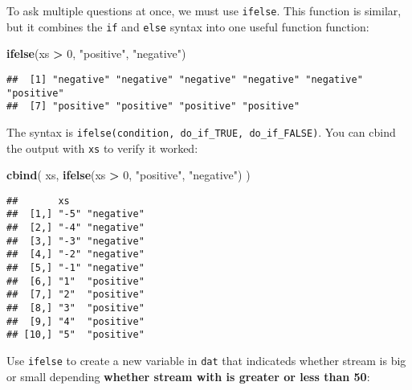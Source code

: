 \documentclass[]{book}
\newenvironment{Shaded}{\begin{snugshade}}{\end{snugshade}}
\newcommand{\KeywordTok}[1]{\textcolor[rgb]{0.13,0.29,0.53}{\textbf{#1}}}
\newcommand{\DecValTok}[1]{\textcolor[rgb]{0.00,0.00,0.81}{#1}}
\newcommand{\StringTok}[1]{\textcolor[rgb]{0.31,0.60,0.02}{#1}}
\newcommand{\OperatorTok}[1]{\textcolor[rgb]{0.81,0.36,0.00}{\textbf{#1}}}
\newcommand{\NormalTok}[1]{#1}
\theoremstyle{definition}
\theoremstyle{definition}
\theoremstyle{definition}
\theoremstyle{remark}
\begin{document}
To ask multiple questions at once, we must use \texttt{ifelse}. This
function is similar, but it combines the \texttt{if} and \texttt{else}
syntax into one useful function function:

\begin{Shaded}
\begin{Highlighting}[]
\KeywordTok{ifelse}\NormalTok{(xs }\OperatorTok{>}\StringTok{ }\DecValTok{0}\NormalTok{, }\StringTok{"positive"}\NormalTok{, }\StringTok{"negative"}\NormalTok{)}
\end{Highlighting}
\end{Shaded}

\begin{verbatim}
##  [1] "negative" "negative" "negative" "negative" "negative" "positive"
##  [7] "positive" "positive" "positive" "positive"
\end{verbatim}

The syntax is \texttt{ifelse(condition,\ do\_if\_TRUE,\ do\_if\_FALSE)}.
You can cbind the output with \texttt{xs} to verify it worked:

\begin{Shaded}
\begin{Highlighting}[]
\KeywordTok{cbind}\NormalTok{(}
\NormalTok{  xs,}
  \KeywordTok{ifelse}\NormalTok{(xs }\OperatorTok{>}\StringTok{ }\DecValTok{0}\NormalTok{, }\StringTok{"positive"}\NormalTok{, }\StringTok{"negative"}\NormalTok{)}
\NormalTok{)}
\end{Highlighting}
\end{Shaded}

\begin{verbatim}
##       xs             
##  [1,] "-5" "negative"
##  [2,] "-4" "negative"
##  [3,] "-3" "negative"
##  [4,] "-2" "negative"
##  [5,] "-1" "negative"
##  [6,] "1"  "positive"
##  [7,] "2"  "positive"
##  [8,] "3"  "positive"
##  [9,] "4"  "positive"
## [10,] "5"  "positive"
\end{verbatim}

Use \texttt{ifelse} to create a new variable in \texttt{dat} that
indicateds whether stream is big or small depending \textbf{whether
stream with is greater or less than 50}:

\begin{Shaded}
\end{Shaded}
\end{document}
